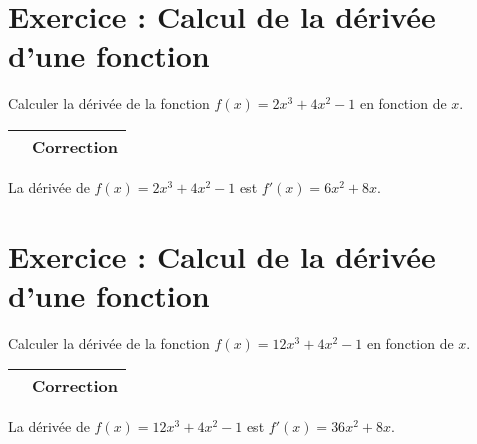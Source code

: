 \documentclass[a4paper, 12pt]{article}
\newenvironment{Exercice}[1][]{
    \section*{Exercice : #1}
}{}
\newenvironment{Correction}[1]{
    \begin{tabular}{|c|c|}
        \hline
    \qrcode{https://example.com/#1} &
    \textbf{Correction} \\ \hline
    \end{tabular}\par
}{}
\begin{document}
\begin{Exercice}[Calcul de la dérivée d'une fonction]
    Calculer la dérivée de la fonction $f(x) = 2x^3 + 4x^2 - 1$ en fonction de $x$.

    \begin{Correction}{exercice_1_correction.pdf}
        La dérivée de $f(x) = 2x^3 + 4x^2 - 1$ est $f'(x) = 6x^2 + 8x$.
    \end{Correction}
\end{Exercice}


\begin{Exercice}[Calcul de la dérivée d'une fonction]
    Calculer la dérivée de la fonction $f(x) = 12x^3 + 4x^2 - 1$ en fonction de $x$.

    \begin{Correction}{exercice_2_correction.pdf}
        La dérivée de $f(x) = 12x^3 + 4x^2 - 1$ est $f'(x) = 36x^2 + 8x$.
    \end{Correction}
\end{Exercice}
\end{document}
